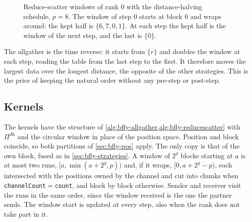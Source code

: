 \begin{figure}[t]
\centering
{}
\caption{Reduce-scatter windows of rank $0$ with the distance-halving schedule, $p=8$. The window of step $0$ starts at block $6$ and wraps around: the kept half is $\{6,7,0,1\}$. At each step the kept half is the window of the next step, and the last is $\{0\}$.}
\label{fig:bfly-circular}
\end{figure}

The allgather is the time reverse: it starts from $\{r\}$ and doubles the window at each step, reading the table from the last step to the first.
It therefore moves the largest data over the longest distance, the opposite of the other strategies. This is the price of keeping the natural order without any pre-step or post-step.

\subsection{Kernels}

The kernels have the structure of \cref{alg:bfly-allgather,alg:bfly-reducescatter} with $\Pi^{\mathrm{dh}}$ and the circular window in place of the position space.
Position and block coincide, so both partitions of \cref{sec:bfly-pos} apply.
The only copy is that of the own block, fused as in \cref{sec:bfly-strategies}.
A window of $2^g$ blocks starting at $a$ is at most two runs, $[a,\min(a+2^g,p))$ and, if it wraps, $[0,a+2^g-p)$, each intersected with the positions owned by the channel and cut into chunks when \texttt{channelCount}$=$\texttt{count}, and block by block otherwise.
Sender and receiver visit the runs in the same order, since the window received is the one the partner sends.
The window start is updated at every step, also when the rank does not take part in it.

